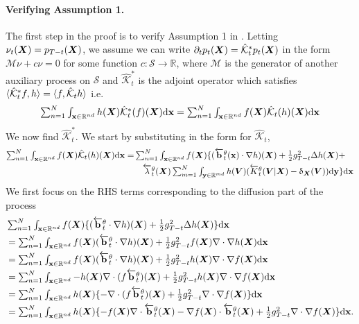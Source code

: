 \paragraph{Verifying Assumption 1.} The first step in the proof is to verify Assumption 1 in
\citet{benton2022denoising}. Letting $\nu_t({\bm{X}}) = p_{T-t}({\bm{X}})$, we assume we can
write $\partial_t p_t ({\bm{X}}) = \hat{\mathcal{K}}_t^* p_t({\bm{X}})$ in the form
$\mathcal{M}\nu + c \nu = 0$ for some function
$c : \mathcal{S} \rightarrow \mathbb{R}$, where $\mathcal{M}$ is the generator
of another auxiliary process on $\mathcal{S}$ and $\hat{\mathcal{K}}_t^*$ is the
adjoint operator which satisfies
$\langle \hat{\mathcal{K}}^*_t f, h \rangle = \langle f, \hat{\mathcal{K}}_t h \rangle$ i.e.
\begin{equation}
  \textstyle   \sum_{n=1}^N \int_{{\mathbf{x}} \in \mathbb{R}^{nd}} h({\bm{X}}) \hat{\mathcal{K}}_t^*(f)({\bm{X}}) \mathrm{d} {\mathbf{x}} = \sum_{n=1}^N \int_{{\mathbf{x}} \in \mathbb{R}^{nd}} f({\bm{X}}) \hat{\mathcal{K}}_t(h)({\bm{X}}) \mathrm{d} {\mathbf{x}}
\end{equation}
We now find $\hat{\mathcal{K}}_t^*$. We start by substituting in the form for $\hat{\mathcal{K}}_t$,
\begin{align}
    \textstyle \sum_{n=1}^N \int_{{\mathbf{x}} \in \mathbb{R}^{nd}} f({\bm{X}}) \hat{\mathcal{K}}_t(h)({\bm{X}}) \mathrm{d} {\mathbf{x}} =&\textstyle \sum_{n=1}^N \int_{{\mathbf{x}} \in \mathbb{R}^{nd}} f({\bm{X}}) \{ (\overleftarrow{\mathbf{b}}_t^\theta({\mathbf{x}}) \cdot \nabla h)({\bm{X}}) + \frac{1}{2} g_{T-t}^2 \Delta h ({\bm{X}}) + \\
    & \quad \textstyle \overleftarrow{\lambda}_t^\theta({\bm{X}}) \sum_{m=1}^N \int_{\mathbf{y} \in \mathbb{R}^{md}} h({\bm{V}}) ( \overleftarrow{K}_t^\theta({\bm{V}} | {\bm{X}}) - \updelta_{{\bm{X}}}({\bm{V}}) ) \mathrm{d}\mathbf{y} \} \mathrm{d} {\mathbf{x}} 
\end{align}
We first focus on the RHS terms corresponding to the diffusion part of the process
\begin{align}
  &\textstyle \sum_{n=1}^N \int_{{\mathbf{x}} \in \mathbb{R}^{nd}} f({\bm{X}}) \{ (\overleftarrow{\mathbf{b}}_t^\theta \cdot \nabla h)({\bm{X}}) + \frac{1}{2} g_{T-t}^2 \Delta h ({\bm{X}}) \} \mathrm{d} {\mathbf{x}}\\
  &\textstyle = \sum_{n=1}^N \int_{{\mathbf{x}} \in \mathbb{R}^{nd}} f({\bm{X}}) (\overleftarrow{\mathbf{b}}_t^\theta \cdot \nabla h)({\bm{X}}) + \frac{1}{2} g_{T-t}^2 f({\bm{X}}) \nabla \cdot \nabla h ({\bm{X}}) \mathrm{d} {\mathbf{x}}\\
  &\textstyle = \sum_{n=1}^N \int_{{\mathbf{x}} \in \mathbb{R}^{nd}} f({\bm{X}}) (\overleftarrow{\mathbf{b}}_t^\theta \cdot \nabla h)({\bm{X}}) + \frac{1}{2} g_{T-t}^2 h({\bm{X}}) \nabla \cdot \nabla f ({\bm{X}}) \mathrm{d} {\mathbf{x}}\\
  &\textstyle = \sum_{n=1}^N \int_{{\mathbf{x}} \in \mathbb{R}^{nd}}  -h ({\bm{X}}) \nabla \cdot ( f \overleftarrow{\mathbf{b}}_t^\theta)({\bm{X}}) + \frac{1}{2} g_{T-t}^2 h({\bm{X}}) \nabla \cdot \nabla f ({\bm{X}}) \mathrm{d} {\mathbf{x}}\\
  &\textstyle = \sum_{n=1}^N \int_{{\mathbf{x}} \in \mathbb{R}^{nd}}  h ({\bm{X}}) \{ - \nabla \cdot ( f \overleftarrow{\mathbf{b}}_t^\theta)({\bm{X}}) + \frac{1}{2} g_{T-t}^2 \nabla \cdot \nabla f ({\bm{X}}) \} \mathrm{d} {\mathbf{x}}\\
  &\textstyle = \sum_{n=1}^N \int_{{\mathbf{x}} \in \mathbb{R}^{nd}}  h ({\bm{X}}) \{ -f({\bm{X}}) \nabla \cdot \overleftarrow{\mathbf{b}}_t^\theta({\bm{X}}) - \nabla f({\bm{X}}) \cdot \overleftarrow{\mathbf{b}}_t^\theta({\bm{X}}) + \frac{1}{2} g_{T-t}^2 \nabla \cdot \nabla f ({\bm{X}}) \} \mathrm{d} {\mathbf{x}} .
\end{align}
